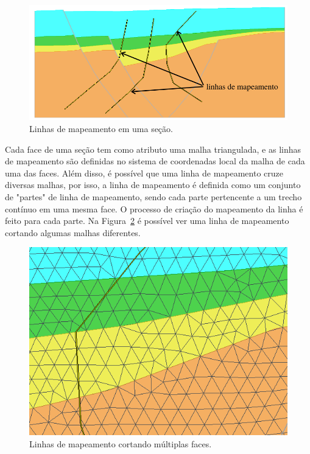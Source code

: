 \begin{figure} [h]
  \begin{center}
    \includegraphics[width=400pt]{images/fig-linhas-de-mapeamento-ed}
    \caption{Linhas de mapeamento em uma seção.}\label{fig-linemap}
  \end{center}
\end{figure}

Cada face de uma seção tem como atributo uma malha triangulada, e as linhas de mapeamento são definidas no sistema de coordenadas local da malha de cada uma das faces. Além disso, é possível que uma linha de mapeamento cruze diversas malhas, por isso, a linha de mapeamento é definida como um conjunto de "partes" de linha de mapeamento, sendo cada parte pertencente a um trecho contínuo em uma mesma face. O processo de criação do mapeamento da linha é feito para cada parte. Na Figura~\ref{fig-linemap-malhas} é possível ver uma linha de mapeamento cortando algumas malhas diferentes.

\begin{figure} [h]
  \begin{center}
    \includegraphics[width=350pt]{images/fig-linhas-de-mapeamento-malhas}
    \caption{Linhas de mapeamento cortando múltiplas faces.}\label{fig-linemap-malhas}
  \end{center}
\end{figure}

